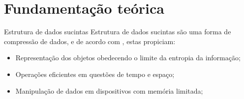 \section{Fundamentação teórica}

\begin{frame}{Estrutura de dados sucintas}
Estrutura de dados sucintas são uma forma de compressão de dados, e de acordo com \cite{book-compact-data-structures}, estas propiciam:
\begin{itemize}
    \item Representação dos objetos obedecendo o limite da entropia da informação;
    \item Operações eficientes em questões de tempo e espaço;
    \item Manipulação de dados em dispositivos com memória limitada;
\end{itemize}
\end{frame}







